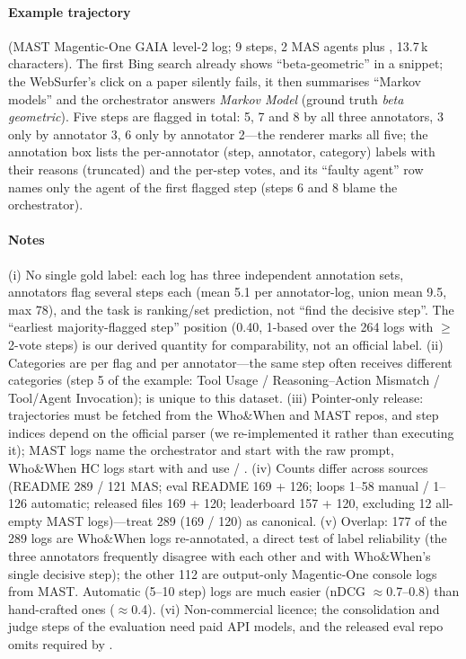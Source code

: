 \paragraph{Example trajectory}  (MAST Magentic-One GAIA level-2 log; 9 steps, 2 MAS agents plus , 13.7\,k characters). The first Bing search already shows ``beta-geometric'' in a snippet; the WebSurfer's click on a paper silently fails, it then summarises ``Markov models'' and the orchestrator answers \emph{Markov Model} (ground truth \emph{beta geometric}). Five steps are flagged in total: 5, 7 and 8 by all three annotators, 3 only by annotator 3, 6 only by annotator 2---the renderer marks all five; the annotation box lists the per-annotator (step, annotator, category) labels with their reasons (truncated) and the per-step votes, and its ``faulty agent'' row names only the agent of the first flagged step (steps 6 and 8 blame the orchestrator).


\paragraph{Notes} (i) No single gold label: each log has three independent annotation sets, annotators flag several steps each (mean 5.1 per annotator-log, union mean 9.5, max 78), and the task is ranking/set prediction, not ``find the decisive step''. The ``earliest majority-flagged step'' position (0.40, 1-based over the 264 logs with $\ge$2-vote steps) is our derived quantity for comparability, not an official label. (ii) Categories are per flag and per annotator---the same step often receives different categories (step 5 of the example: Tool Usage / Reasoning--Action Mismatch / Tool/Agent Invocation);  is unique to this dataset. (iii) Pointer-only release: trajectories must be fetched from the Who\&When and MAST repos, and step indices depend on the official parser (we re-implemented it rather than executing it); MAST logs name the orchestrator  and start with the raw  prompt, Who\&When HC logs start with  and use  / . (iv) Counts differ across sources (README 289 / 121 MAS; eval README 169 + 126;  loops 1--58 manual / 1--126 automatic; released files 169 + 120; leaderboard 157 + 120, excluding 12 all-empty MAST logs)---treat 289 (169 / 120) as canonical. (v) Overlap: 177 of the 289 logs are Who\&When logs re-annotated, a direct test of label reliability (the three annotators frequently disagree with each other and with Who\&When's single decisive step); the other 112 are output-only Magentic-One console logs from MAST. Automatic (5--10 step) logs are much easier (nDCG $\approx$0.7--0.8) than hand-crafted ones ($\approx$0.4). (vi) Non-commercial licence; the consolidation and judge steps of the evaluation need paid API models, and the released eval repo omits  required by .
